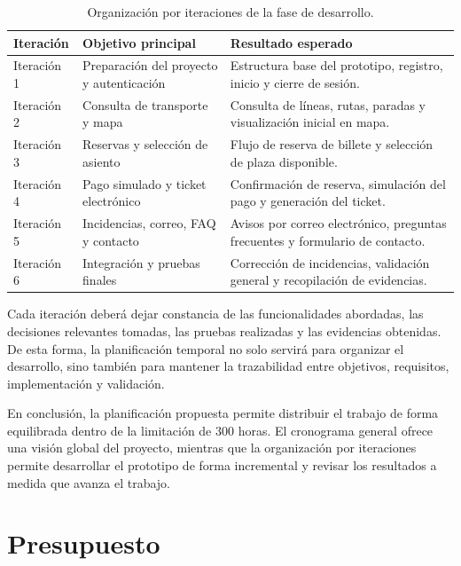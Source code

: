 \begin{table}[h!]
\centering
\small
\begin{tabular}{|p{2.5cm}|p{5cm}|p{7cm}|}
\hline
\textbf{Iteración} & \textbf{Objetivo principal} & \textbf{Resultado esperado} \\ \hline
Iteración 1 & Preparación del proyecto y autenticación & Estructura base del prototipo, registro, inicio y cierre de sesión. \\ \hline
Iteración 2 & Consulta de transporte y mapa            & Consulta de líneas, rutas, paradas y visualización inicial en mapa. \\ \hline
Iteración 3 & Reservas y selección de asiento          & Flujo de reserva de billete y selección de plaza disponible. \\ \hline
Iteración 4 & Pago simulado y ticket electrónico       & Confirmación de reserva, simulación del pago y generación del ticket. \\ \hline
Iteración 5 & Incidencias, correo, FAQ y contacto      & Avisos por correo electrónico, preguntas frecuentes y formulario de contacto. \\ \hline
Iteración 6 & Integración y pruebas finales            & Corrección de incidencias, validación general y recopilación de evidencias. \\ \hline
\end{tabular}
\caption{Organización por iteraciones de la fase de desarrollo.}
\label{tab:iteraciones}
\end{table}

Cada iteración deberá dejar constancia de las funcionalidades abordadas, las decisiones relevantes tomadas, las pruebas realizadas y las evidencias obtenidas. De esta forma, la planificación temporal no solo servirá para organizar el desarrollo, sino también para mantener la trazabilidad entre objetivos, requisitos, implementación y validación.

En conclusión, la planificación propuesta permite distribuir el trabajo de forma equilibrada dentro de la limitación de 300 horas. El cronograma general ofrece una visión global del proyecto, mientras que la organización por iteraciones permite desarrollar el prototipo de forma incremental y revisar los resultados a medida que avanza el trabajo.


\section{Presupuesto}
\label{sec:presupuesto}

